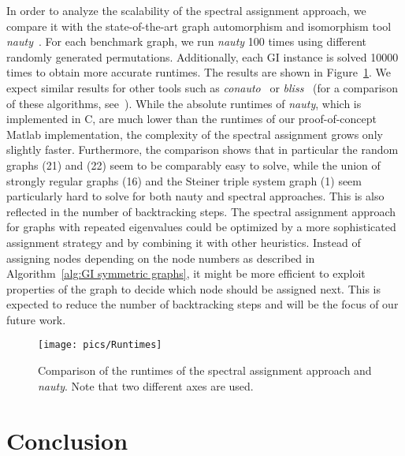 \documentclass
[
    a4paper,
    DIV=11,
    abstracton
]
{scrartcl}
\theoremstyle{definition}
\begin{document}
In order to analyze the scalability of the spectral assignment approach, we compare it with the state-of-the-art graph automorphism and isomorphism tool \emph{nauty}~\cite{MK81, MKP14}. For each benchmark graph, we run \emph{nauty} 100 times using different randomly generated permutations. Additionally, each GI instance is solved 10000 times to obtain more accurate runtimes. The results are shown in Figure~\ref{fig:Runtimes}. We expect similar results for other tools such as \emph{conauto}~\cite{LAC11b} or \emph{bliss}~\cite{JK07} (for a comparison of these algorithms, see~\cite{MKP14}). While the absolute runtimes of \emph{nauty}, which is implemented in C, are much lower than the runtimes of our proof-of-concept Matlab implementation, the complexity of the spectral assignment grows only slightly faster. Furthermore, the comparison shows that in particular the random graphs (21) and (22) seem to be comparably easy to solve, while the union of strongly regular graphs (16) and the Steiner triple system graph (1) seem particularly hard to solve for both nauty and spectral approaches. This is also reflected in the number of backtracking steps. The spectral assignment approach for graphs with repeated eigenvalues could be optimized by a more sophisticated assignment strategy and by combining it with other heuristics. Instead of assigning nodes depending on the node numbers as described in Algorithm~\ref{alg:GI symmetric graphs}, it might be more efficient to exploit properties of the graph to decide which node should be assigned next. This is expected to reduce the number of backtracking steps and will be the focus of our future work.

\begin{figure}[htb]
    \centering
    \texttt{[image: pics/Runtimes]}
    \caption{Comparison of the runtimes of the spectral assignment approach and \emph{nauty}. Note that two different axes are used.}
    \label{fig:Runtimes}
\end{figure}

\section{Conclusion}
\label{sec:Conclusion}
\end{document}
